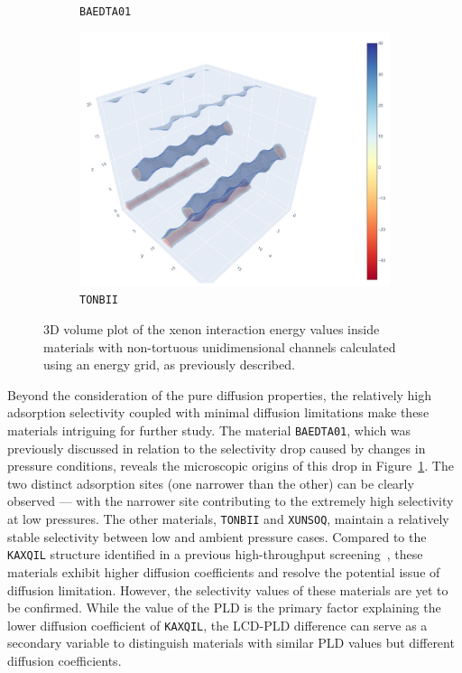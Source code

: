 \documentclass[main]{subfiles}
\begin{document}
\begin{figure}[ht]
\begin{subfigure}[b]{0.32\textwidth}
      \caption{\texttt{BAEDTA01}~\cite{Chen_2010}}\label{fgr:tube_cavities_b}
  \end{subfigure}
  \hfill
  \begin{subfigure}[b]{0.32\textwidth}
      \centering
      \includegraphics[width=\textwidth]{figures/5-diffusion/viz/TONBII.jpg}
      \caption{\texttt{TONBII}~\cite{Du_2010}}\label{fgr:tube_cavities_c}
  \end{subfigure}
     \caption{ 3D volume plot of the xenon interaction energy values inside materials with non-tortuous unidimensional channels calculated using an energy grid, as previously described.}\label{fgr:tube_cavities}
\end{figure}

Beyond the consideration of the pure diffusion properties, the relatively high adsorption selectivity coupled with minimal diffusion limitations make these materials intriguing for further study. The material \texttt{BAEDTA01}, which was previously discussed in relation to the selectivity drop caused by changes in pressure conditions, reveals the microscopic origins of this drop in Figure~\ref{fgr:tube_cavities_b}. The two distinct adsorption sites (one narrower than the other) can be clearly observed --- with the narrower site contributing to the extremely high selectivity at low pressures. The other materials, \texttt{TONBII} and \texttt{XUNSOQ}, maintain a relatively stable selectivity between low and ambient pressure cases. Compared to the \texttt{KAXQIL} structure identified in a previous high-throughput screening~\autocite{Simon_2015}, these materials exhibit higher diffusion coefficients and resolve the potential issue of diffusion limitation. However, the selectivity values of these materials are yet to be confirmed. While the value of the PLD is the primary factor explaining the lower diffusion coefficient of \texttt{KAXQIL}, the LCD-PLD difference can serve as a secondary variable to distinguish materials with similar PLD values but different diffusion coefficients.
\end{document}
